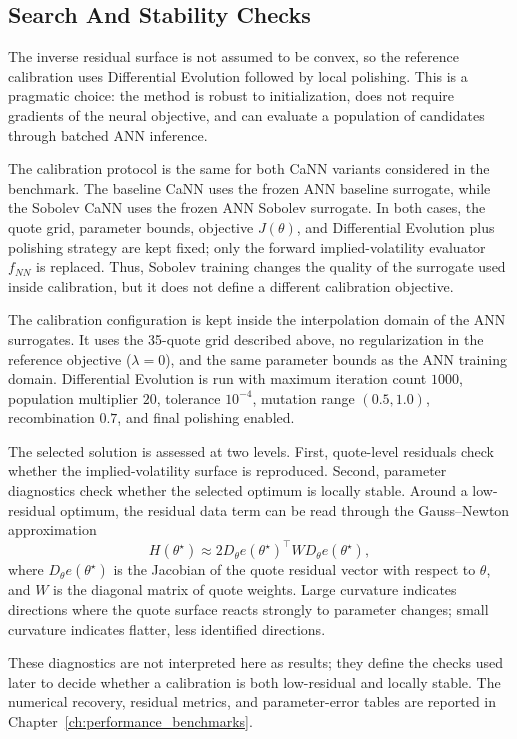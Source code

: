 \subsection{Search And Stability Checks}
\label{sec:cann_search_stability}

The inverse residual surface is not assumed to be convex, so the reference calibration uses Differential Evolution followed by local polishing. This is a pragmatic choice: the method is robust to initialization, does not require gradients of the neural objective, and can evaluate a population of candidates through batched ANN inference.

The calibration protocol is the same for both CaNN variants considered in the benchmark. The baseline CaNN uses the frozen ANN baseline surrogate, while the Sobolev CaNN uses the frozen ANN Sobolev surrogate. In both cases, the quote grid, parameter bounds, objective \(J(\theta)\), and Differential Evolution plus polishing strategy are kept fixed; only the forward implied-volatility evaluator \(f_{NN}\) is replaced. Thus, Sobolev training changes the quality of the surrogate used inside calibration, but it does not define a different calibration objective.

The calibration configuration is kept inside the interpolation domain of the ANN surrogates. It uses the 35-quote grid described above, no regularization in the reference objective (\(\lambda=0\)), and the same parameter bounds as the ANN training domain. Differential Evolution is run with maximum iteration count \(1000\), population multiplier \(20\), tolerance \(10^{-4}\), mutation range \((0.5,1.0)\), recombination \(0.7\), and final polishing enabled.

The selected solution is assessed at two levels. First, quote-level residuals check whether the implied-volatility surface is reproduced. Second, parameter diagnostics check whether the selected optimum is locally stable. Around a low-residual optimum, the residual data term can be read through the Gauss--Newton approximation
\[
H(\theta^\star)\approx 2D_\theta e(\theta^\star)^\top W D_\theta e(\theta^\star),
\]
where \(D_\theta e(\theta^\star)\) is the Jacobian of the quote residual vector with respect to \(\theta\), and \(W\) is the diagonal matrix of quote weights. Large curvature indicates directions where the quote surface reacts strongly to parameter changes; small curvature indicates flatter, less identified directions.

These diagnostics are not interpreted here as results; they define the checks used later to decide whether a calibration is both low-residual and locally stable. The numerical recovery, residual metrics, and parameter-error tables are reported in Chapter~\ref{ch:performance_benchmarks}.

